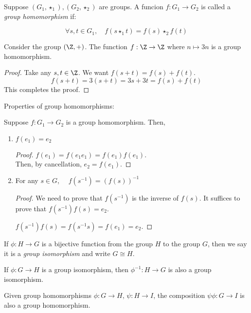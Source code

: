 \documentclass[a5paper]{article}
\begin{document}
\begin{definition*}
Suppose $(G_1, \star_1), (G_2, \star_2)$ are groups. A funcion $f:G_1 \to G_2$ is called a \emph{group homomorphism} if:

$$\forall s,t \in G_1, \quad f(s \star_1 t)=f(s)\star_2 f(t)$$
\end{definition*}

\begin{example*}
Consider the group $(\Z, +)$. The function $f:\Z \to \Z$ where $n \mapsto 3n$ is a group homomorphism. 
\begin{proof}
Take any $s,t \in \Z$. We want $f(s+t) = f(s)+f(t)$. 
$$f(s+t) = 3(s+t) = 3s+3t = f(s)+f(t)$$
This completes the proof. \end{proof}
\end{example*}

Properties of group homomorphisms:
\begin{proposition*}
Suppose $f:G_1 \to G_2$ is a group homomorphism. Then, 
\begin{enumerate}[label=(\roman*)]
\item $f(e_1)=e_2$
\begin{proof}
$f(e_1) = f(e_1e_1) = f(e_1)f(e_1).$\\
Then, by cancellation, $e_2=f(e_1)$. 
\end{proof}
\item For any $s \in G$, $\quad f(s^{-1})=(f(s))^{-1}$
\begin{proof}
We need to prove that $f(s^{-1})$ is the inverse of $f(s)$. It suffices to prove that $f(s^{-1})f(s)=e_2$. 

$f(s^{-1})f(s)=f(s^{-1}s)=f(e_1)=e_2$. 
\end{proof}
\end{enumerate}
\end{proposition*}

\begin{definition*}
If $\phi:H \to G$ is a bijective function from the group $H$ to the group $G$, then we say it is a \emph{group isomorphism} and write $G \cong H$. 
\end{definition*}

\begin{lemma}
If $\phi: G \to H$ is a group isomorphism, then $\phi^{-1}:H \to G$  is also a group isomorphism. 
\end{lemma}

\begin{proposition*}
Given group homomorphisms $\phi: G \to H$, $\psi:  H \to I$, the composition $\psi \phi : G \to I$ is also a group homomorphism. 
\end{proposition*}
\end{document}
